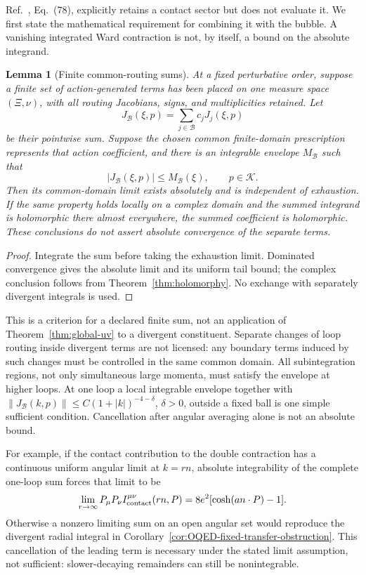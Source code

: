 \documentclass[final,5p,times,twocolumn,numbers,nopreprintline]{elsarticle}
\numberwithin{equation}{section}
\newtheorem{lemma}[theorem]{Lemma}
\theoremstyle{definition}
\theoremstyle{remark}
\begin{document}
Ref.~\cite{ChiapponeIgnition}, Eq.~(78), explicitly retains a contact
sector but does not evaluate it. We first state the mathematical
requirement for combining it with the bubble. A vanishing integrated
Ward contraction is not, by itself, a bound on the absolute integrand.

\begin{lemma}[Finite common-routing sums]
\label{lem:OQED-grouped-convergence}
At a fixed perturbative order, suppose a finite set of action-generated
terms has been placed on one measure space \((\Xi,\nu)\), with all
routing Jacobians, signs, and multiplicities retained. Let
\[
 J_{\mathcal B}(\xi,p)=\sum_{j\in\mathcal B}c_jJ_j(\xi,p)
\]
be their pointwise sum. Suppose the chosen common finite-domain
prescription represents that action coefficient, and there is an
integrable envelope \(M_{\mathcal B}\) such that
\[
 |J_{\mathcal B}(\xi,p)|\leq M_{\mathcal B}(\xi),\qquad p\in\mathcal K.
\]
Then its common-domain limit exists absolutely and is independent of
exhaustion. If the same property holds locally on a complex domain
and the summed integrand is holomorphic there almost everywhere, the
summed coefficient is holomorphic. These conclusions do not assert
absolute convergence of the separate terms.
\end{lemma}
\begin{proof}
Integrate the sum before taking the exhaustion limit. Dominated
convergence gives the absolute limit and its uniform tail bound; the
complex conclusion follows from Theorem~\ref{thm:holomorphy}. No exchange
with separately divergent integrals is used.
\end{proof}

This is a criterion for a declared finite sum, not an application of
Theorem~\ref{thm:global-uv} to a divergent constituent. Separate changes
of loop routing inside divergent terms are not licensed: any boundary
terms induced by such changes must be controlled in the same common
domain. All subintegration regions, not only simultaneous large
momenta, must satisfy the envelope at higher loops. At one loop a
local integrable envelope together with
\(\lVert J_{\mathcal B}(k,p)\rVert\leq C(1+|k|)^{-4-\delta}\),
\(\delta>0\), outside a fixed ball is one simple sufficient condition.
Cancellation after angular averaging alone is not an absolute bound.

For example, if the contact contribution to the double contraction
has a continuous uniform angular limit at \(k=rn\), absolute
integrability of the complete one-loop sum forces that limit to be
\[
 \lim_{r\to\infty}P_\mu P_\nu I_{\rm contact}^{\mu\nu}(rn,P)
       =8e^2[\cosh(a n\cdot P)-1].
\]
Otherwise a nonzero limiting sum on an open angular set would reproduce
the divergent radial integral in
Corollary~\ref{cor:OQED-fixed-transfer-obstruction}. This cancellation
of the leading term is necessary under the stated limit assumption,
not sufficient: slower-decaying remainders can still be nonintegrable.
\end{document}
